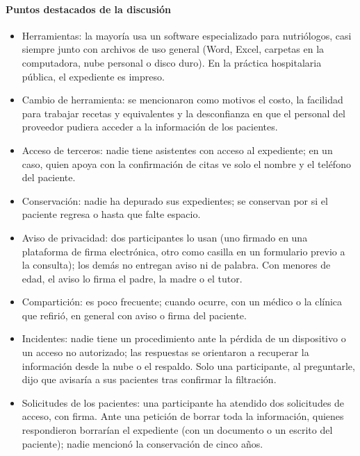 \documentclass[12pt, a4paper]{article}
\begin{document}
\paragraph{Puntos destacados de la discusión}
\begin{itemize}[leftmargin=*,itemsep=1pt]
  \item Herramientas: la mayoría usa un software especializado para nutriólogos, casi siempre junto con archivos de uso general (Word, Excel, carpetas en la computadora, nube personal o disco duro). En la práctica hospitalaria pública, el expediente es impreso.
  \item Cambio de herramienta: se mencionaron como motivos el costo, la facilidad para trabajar recetas y equivalentes y la desconfianza en que el personal del proveedor pudiera acceder a la información de los pacientes.
  \item Acceso de terceros: nadie tiene asistentes con acceso al expediente; en un caso, quien apoya con la confirmación de citas ve solo el nombre y el teléfono del paciente.
  \item Conservación: nadie ha depurado sus expedientes; se conservan por si el paciente regresa o hasta que falte espacio.
  \item Aviso de privacidad: dos participantes lo usan (uno firmado en una plataforma de firma electrónica, otro como casilla en un formulario previo a la consulta); los demás no entregan aviso ni de palabra. Con menores de edad, el aviso lo firma el padre, la madre o el tutor.
  \item Compartición: es poco frecuente; cuando ocurre, con un médico o la clínica que refirió, en general con aviso o firma del paciente.
  \item Incidentes: nadie tiene un procedimiento ante la pérdida de un dispositivo o un acceso no autorizado; las respuestas se orientaron a recuperar la información desde la nube o el respaldo. Solo una participante, al preguntarle, dijo que avisaría a sus pacientes tras confirmar la filtración.
  \item Solicitudes de los pacientes: una participante ha atendido dos solicitudes de acceso, con firma. Ante una petición de borrar toda la información, quienes respondieron borrarían el expediente (con un documento o un escrito del paciente); nadie mencionó la conservación de cinco años.
\end{itemize}
\end{document}
